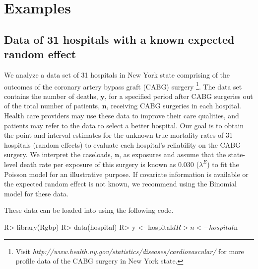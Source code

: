 \documentclass[article]{jss}
\begin{document}
\section[Examples]{Examples}\label{sec6}
\subsection[Known Second-level Mean]{Data of 31 hospitals with a known expected random effect}
\label{sec:ex:hosp}


We analyze a data set of 31 hospitals in New York state comprising of the outcomes of the coronary artery bypass graft (CABG) surgery \citep{morris2012}\footnote{Visit \emph{http://www.health.ny.gov/statistics/diseases/cardiovascular/} for more profile data of the CABG surgery in New York state.}. The data set contains the number of deaths, $\boldsymbol{y}$, for a specified period after CABG surgeries out of the total number of patients, $\boldsymbol{n}$, receiving CABG surgeries in each hospital. Health care providers may use these data to improve their care qualities, and patients may refer to the data to select a better hospital. Our goal is to obtain the point and interval estimates for the unknown true mortality rates of 31 hospitals (random effects) to evaluate  each hospital's reliability on the CABG surgery. We interpret the caseloads, $\boldsymbol{n}$,  as exposures and assume that the state-level death rate per exposure of this surgery is known as 0.030 ($\lambda^E$) to fit the Poisson model for an illustrative purpose.  If covariate information is available or the expected random effect is not known, we recommend using the Binomial model for these data.


These data can be loaded into  using the following code.
\begin{CodeChunk}
\begin{CodeInput}
R> library(Rgbp)
R> data(hospital)
R> y <- hospital$d
R> n <- hospital$n
\end{CodeInput}
\end{CodeChunk}




\end{document}
